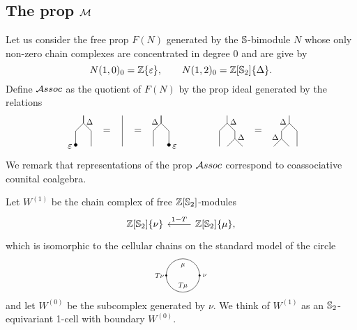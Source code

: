 \subsection{The prop $\M$} \label{ss:the prop M}

Let us consider the free prop $F(N)$ generated by the $\S$-bimodule $N$ whose only non-zero chain complexes are concentrated in degree $0$ and are give by
\begin{equation*}
N(1, 0)_0 = \Z\{\varepsilon\}, \qquad
N(1, 2)_0 = \Z[\S_2]\{\Delta\}.
\end{equation*}
Define $\A$ as the quotient of $F(N)$ by the prop ideal generated by the relations
\begin{equation*}
\begin{tikzpicture}[scale=.28]
\draw (-4,0)--(-4,2)--(-5,3)--(-5,4);
\draw (-6,0)--(-6,2)--(-5,3)--(-5,4);
\node [scale=.8] at (-4.2,3.2) {$\Delta$};
\draw [fill] (-6,.2) circle [radius=.2];
\node [left] at (-6,0) {$\varepsilon$};

\node at (-2,2) {=};
\draw (0,0)--(0,4);
\node at (2,2) {=};

\draw (4,0)--(4,2)--(5,3)--(5,4);
\draw (6,0)--(6,2)--(5,3)--(5,4);
\node [scale=.8] at (4.2,3.2) {$\Delta$};
\draw [fill] (6,.2) circle [radius=.2];
\node [right] at (6,0) {$\varepsilon$};
\end{tikzpicture}
\qquad \qquad
\begin{tikzpicture}[scale=.28]
\node at (0,2){=};
\node at (0,0) {\phantom{$\varepsilon$}};

\draw (2,0)--(3,1)--(3,2)--(4,3)--(4,4);
\draw (4,0)--(3,1);
\draw (4,3)--(5,2)--(5,0);
\node [scale=.8] at (3.2,3.2) {$\Delta$};
\node [scale=.8] at (2.2,1.2) {$\Delta$};

\draw (-2,0)--(-3,1)--(-3,2)--(-4,3)--(-4,4);
\draw (-4,0)--(-3,1);
\draw (-4,3)--(-5,2)--(-5,0);
\node [scale=.8] at (-3.2,3.2) {$\Delta$};
\node [scale=.8] at (-2.2,1.2) {$\Delta$};
\end{tikzpicture}
\end{equation*}
We remark that representations of the prop $\A$ correspond to coassociative counital coalgebra.

Let $W^{(1)}$ be the chain complex of free $\Z[\S_2]$-modules
\begin{equation*}
\begin{tikzcd}
\Z[\S_2]\{\nu\} &[0pt] \arrow[l, "1-T"'] \Z[\S_2]\{\mu\},
\end{tikzcd} 
\end{equation*}
which is isomorphic to the cellular chains on the standard model of the circle
\begin{equation*}
\begin{tikzpicture}[scale=.85]
\draw (0,0) circle (20pt);
\node[scale=.7] at (0,12pt){$\mu$};
\node[scale=.7] at (0,-12pt){$T \mu$};
\node[scale=.7] at (-28pt,0){$T \nu$};
\node[scale=.7] at (26pt,0){$\nu$};
\draw [fill] (-20pt,0) circle [radius=1pt];
\draw [fill] (20pt,0) circle [radius=1pt];
\end{tikzpicture}
\end{equation*}
and let $W^{(0)}$ be the subcomplex generated by $\nu$. We think of $W^{(1)}$ as an $\S_2$-equivariant 1-cell with boundary $W^{(0)}$.

